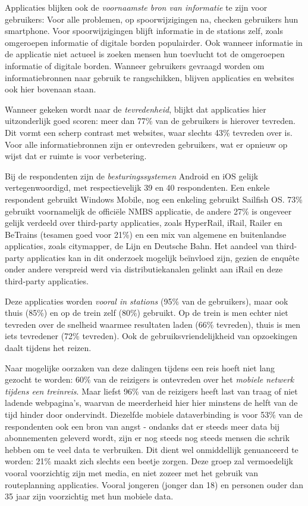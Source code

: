 Applicaties blijken ook de \emph{voornaamste bron van informatie} te zijn voor gebruikers: Voor alle problemen, op spoorwijzigingen na, checken gebruikers hun smartphone. Voor spoorwijzigingen blijft informatie in de stations zelf, zoals omgeroepen informatie of digitale borden populairder. Ook wanneer informatie in de applicatie niet actueel is zoeken mensen hun toevlucht tot de omgeroepen informatie of digitale borden. Wanneer gebruikers gevraagd worden om informatiebronnen naar gebruik te rangschikken, blijven applicaties en websites ook hier bovenaan staan.

Wanneer gekeken wordt naar de \emph{tevredenheid}, blijkt dat applicaties hier uitzonderlijk goed scoren: meer dan 77\% van de gebruikers is hierover tevreden. Dit vormt een scherp contrast met websites, waar slechts 43\% tevreden over is. Voor alle informatiebronnen zijn er ontevreden gebruikers, wat er opnieuw op wijst dat er ruimte is voor verbetering.

Bij de respondenten zijn de \emph{besturingssystemen} Android en iOS gelijk vertegenwoordigd, met respectievelijk 39 en 40 respondenten. Een enkele respondent gebruikt Windows Mobile, nog een enkeling gebruikt Sailfish OS. 73\% gebruikt voornamelijk de officiële NMBS applicatie, de andere 27\% is ongeveer gelijk verdeeld over third-party applicaties, zoals HyperRail, iRail, Railer en BeTrains (tesamen goed voor 21\%) en een mix van algemene en buitenlandse applicaties, zoals citymapper, de Lijn en Deutsche Bahn. Het aandeel van third-party applicaties kan in dit onderzoek mogelijk beïnvloed zijn, gezien de enquête onder andere verspreid werd via distributiekanalen gelinkt aan iRail en deze third-party applicaties.

Deze applicaties worden \emph{vooral in stations} (95\% van de gebruikers), maar ook thuis (85\%) en op de trein zelf (80\%) gebruikt. Op de trein is men echter niet tevreden over de snelheid waarmee resultaten laden (66\% tevreden), thuis is men iets tevredener (72\% tevreden). Ook de gebruiksvriendelijkheid van opzoekingen daalt tijdens het reizen. 

Naar mogelijke oorzaken van deze dalingen tijdens een reis hoeft niet lang gezocht te worden: 60\% van de reizigers is ontevreden over het \emph{mobiele netwerk tijdens een treinreis}. Maar liefst 96\% van de reizigers heeft last van traag of niet ladende webpagina's, waarvan de meerderheid hier hier minstens de helft van de tijd hinder door ondervindt. Diezelfde mobiele dataverbinding is voor 53\% van de respondenten ook een bron van angst - ondanks dat er steeds meer data bij abonnementen geleverd wordt, zijn er nog steeds nog steeds mensen die schrik hebben om te veel data te verbruiken. Dit dient wel onmiddellijk genuanceerd te worden: 21\% maakt zich slechts een beetje zorgen. Deze groep zal vermoedelijk vooral voorzichtig zijn met media, en niet zozeer met het gebruik van routeplanning applicaties. Vooral jongeren (jonger dan 18) en personen ouder dan 35 jaar zijn voorzichtig met hun mobiele data.

